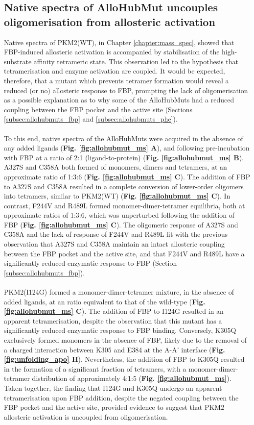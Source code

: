 \subsection{Native spectra of AlloHubMut uncouples oligomerisation from allosteric activation}
\label{subsec:allohubmut_ms}
Native spectra of PKM2(WT), in Chapter \ref{chapter:mass_spec}, showed that FBP-induced allosteric activation is accompanied by stabilisation of the high-substrate affinity tetrameric state. This observation led to the hypothesis that tetramerisation and enzyme activation are coupled. It would be expected, therefore, that a mutant which prevents tetramer formation would reveal a reduced (or no) allosteric response to FBP, prompting the lack of oligomerisation as a possible explanation as to why some of the AlloHubMuts had a reduced coupling between the FBP pocket and the active site (Sections \ref{subsec:allohubmuts_fbp} and \ref{subsec:allohubmuts_phe}).
%
%
\\\\
%
%
To this end, native spectra of the AlloHubMuts were acquired in the absence of any added ligands (\textbf{Fig. \ref{fig:allohubmut_ms} A}), and following pre-incubation with FBP at a ratio of 2:1 (ligand-to-protein) (\textbf{Fig. \ref{fig:allohubmut_ms} B}). A327S and C358A both formed of monomers, dimers and tetramers, at an approximate ratio of 1:3:6 (\textbf{Fig. \ref{fig:allohubmut_ms} C}). The addition of FBP to A327S and C358A resulted in a complete conversion of lower-order oligomers into tetramers, similar to PKM2(WT) (\textbf{Fig. \ref{fig:allohubmut_ms} C}). In contrast, F244V and R489L formed monomer-dimer-tetramer equilibria, both at approximate ratios of 1:3:6, which was unperturbed following the addition of FBP (\textbf{Fig. \ref{fig:allohubmut_ms} C}). The oligomeric response of A327S and C358A and the lack of response of F244V and R489L fit with the previous observation that A327S and C358A maintain an intact allosteric coupling between the FBP pocket and the active site, and that F244V and R489L have a significantly reduced enzymatic response to FBP (Section \ref{subsec:allohubmuts_fbp}). 
%
%
\\\\
%
%
PKM2(I124G) formed a monomer-dimer-tetramer mixture, in the absence of added ligands, at an ratio equivalent to that of the wild-type (\textbf{Fig. \ref{fig:allohubmut_ms} C}). The addition of FBP to I124G resulted in an apparent tetramerisation, despite the observation that this mutant has a significantly reduced enzymatic response to FBP binding. Conversely, K305Q exclusively formed monomers in the absence of FBP, likely due to the removal of a charged interaction between K305 and E384 at the A-A' interface (\textbf{Fig. \ref{fig:unfolding_apo} H}). Nevertheless, the addition of FBP to K305Q resulted in the formation of a significant fraction of tetramers, with a monomer-dimer-tetramer distribution of approximately 4:1:5 (\textbf{Fig. \ref{fig:allohubmut_ms}}). Taken together, the finding that I124G and K305Q undergo an apparent tetramerisation upon FBP addition, despite the negated coupling between the FBP pocket and the active site, provided evidence to suggest that PKM2 allosteric activation is uncoupled from oligomerisation. 
